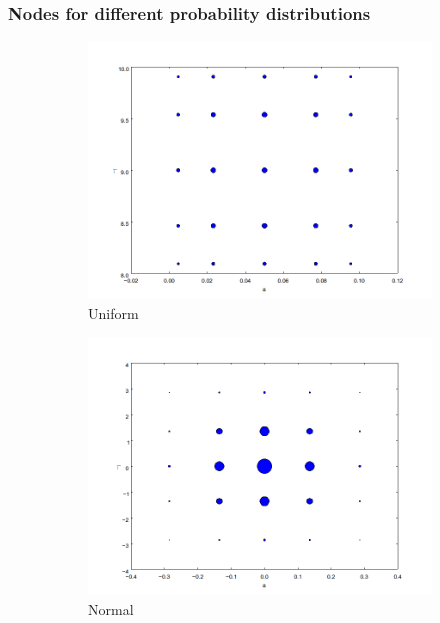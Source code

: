 \documentclass{beamer}
\begin{document}
 
  \begin{frame}
 \frametitle{Nodes for different probability distributions}
 \begin{figure}        
 \begin{subfigure}[b]{0.37\textwidth}
                \includegraphics[width=\textwidth]{nodes_uniform.png}
                \caption{Uniform}
        \end{subfigure}%
 \begin{subfigure}[b]{0.37\textwidth}
                \includegraphics[width=\textwidth]{nodes_normal.png}
                \caption{Normal}
        \end{subfigure}
 \begin{subfigure}[b]{0.37\textwidth}

\end{subfigure}
\end{figure}
\end{frame}
\end{document}
